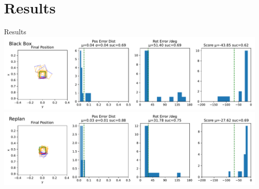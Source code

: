 \documentclass[16:9,en,navbarinfooter]{sdqbeamer}
\begin{document}
\section{Results}
\begin{frame}{Results}
\center
    \includegraphics[width=.7\linewidth]{media/blackbox_presentation.pdf}\\
    \includegraphics[width=.7\linewidth]{media/replan_presentation.pdf}
\end{frame}


\appendix
\beginbackup{}
\backupend{}
\end{document}
